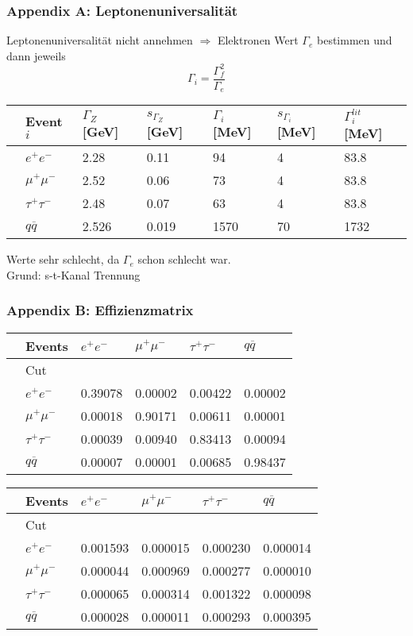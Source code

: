 \begin{frame}
	\frametitle{Appendix A: Leptonenuniversalität}
	Leptonenuniversalität nicht annehmen $\Rightarrow$ Elektronen Wert $\Gamma_e$ bestimmen und dann jeweils
	\begin{equation*}
	\Gamma_i=\frac{\Gamma_f^2}{\Gamma_e}
	\end{equation*}
	\begin{table}[h]\centering
		\begin{tabular}{@{}lllllll@{}}
			\toprule
			&Event $i$&$\Gamma_{Z}$ [GeV]&$s_{\Gamma_{Z}}$ [GeV]&$\Gamma_i$ [MeV]&$s_{\Gamma_i}$ [MeV]&$\Gamma_i^{lit}$ [MeV]\\
			\midrule
			&$e^+e^-$&2.28&0.11&94&4&83.8\\
			&$\mu^+\mu^-$&2.52&0.06&73&4&83.8\\
			&$\tau^+\tau^-$&2.48&0.07&63&4&83.8\\
			&$q\overline{q}$&2.526&0.019&1570&70&1732\\
			\bottomrule
		\end{tabular}
	\end{table}
	Werte sehr schlecht, da $\Gamma_e$ schon schlecht war.\\
	Grund: s-t-Kanal Trennung
\end{frame}
\begin{frame}
	\frametitle{Appendix B: Effizienzmatrix}
	\noindent{}
	\centering
	\begin{tabular}{@{}llllll@{}}
		\toprule
		&Events &$e^+e^-$&$\mu^+\mu^-$&$\tau^+\tau^-$&$q\overline{q}$\\
		\midrule
		&Cut&&&&\\
		&$e^+e^-$&0.39078&0.00002&0.00422&0.00002\\
		&$\mu^+\mu^-$&0.00018&0.90171&0.00611&0.00001\\
		&$\tau^+\tau^-$&0.00039&0.00940&0.83413&0.00094\\
		&$q\overline{q}$&0.00007&0.00001&0.00685&0.98437\\
	\end{tabular}
	\noindent{}
	\begin{tabular}{@{}llllll@{}}
		\toprule
		&Events &$e^+e^-$&$\mu^+\mu^-$&$\tau^+\tau^-$&$q\overline{q}$\\
		\midrule
		&Cut&&&&\\
		&$e^+e^-$&0.001593&0.000015&0.000230&0.000014\\
		&$\mu^+\mu^-$&0.000044&0.000969&0.000277&0.000010\\
		&$\tau^+\tau^-$&0.000065&0.000314&0.001322&0.000098\\
		&$q\overline{q}$&0.000028&0.000011&0.000293&0.000395\\
		\bottomrule
	\end{tabular}	
\end{frame}
